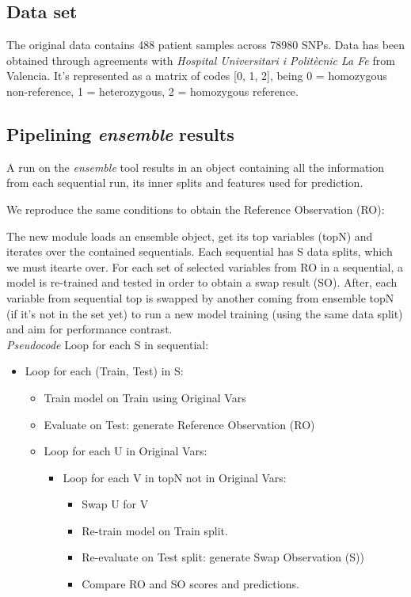 \subsection{Data set}
The original data contains 488 patient samples across 78980 SNPs. Data has been obtained through agreements with \emph{Hospital Universitari i Politècnic La Fe} from Valencia. It's represented as a matrix of codes [0, 1, 2], being 0 = homozygous non-reference, 1 = heterozygous, 2 = homozygous reference.

\subsection{Pipelining \emph{ensemble} results}
\label{section:methods:pipeline}
A run on the \emph{ensemble} tool results in an object containing all the information from each sequential run, its inner splits and features used for prediction.

We reproduce the same conditions to obtain the Reference Observation (RO):

The new module loads an ensemble object, get its top variables (topN) and iterates over the contained sequentials. Each sequential has S data splits, which we must itearte over. For each set of selected variables from RO in a sequential, a model is re-trained and tested in order to obtain a swap result (SO). After, each variable from sequential top is swapped by another coming from ensemble topN (if it’s not in the set yet) to run a new model training (using the same data split) and aim for performance contrast.
\\

\emph{Pseudocode}
Loop for each S in sequential:
\begin{itemize}
    \item Loop for each (Train, Test) in S:
    \begin{itemize}
        \item Train model on Train using Original Vars
        \item Evaluate on Test: generate Reference Observation (RO)
        \item Loop for each U in Original Vars:
        \begin{itemize}
            \item Loop for each V in topN not in Original Vars:
            \begin{itemize}
                \item Swap U for V
                \item Re-train model on Train split.
                \item Re-evaluate on Test split: generate Swap Observation (S))
                \item Compare RO and SO scores and predictions.
            \end{itemize}
        \end{itemize}
    \end{itemize}
\end{itemize}



